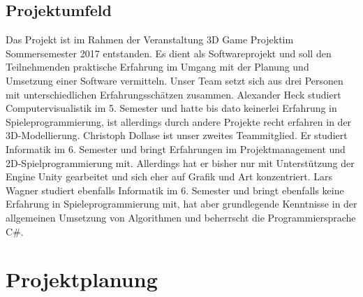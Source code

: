 \documentclass[10pt]{article}
\begin{document}
\newpage
\vspace{0.5cm}
\subsection{Projektumfeld}
Das Projekt ist im Rahmen der Veranstaltung \glqq 3D Game Projekt\grqq im Sommersemester 2017 entstanden. Es dient als Softwareprojekt und soll den Teilnehmenden praktische Erfahrung im Umgang mit der Planung und Umsetzung einer Software vermitteln. Unser Team setzt sich aus drei Personen mit unterschiedlichen Erfahrungsschätzen zusammen. \newline
Alexander Heck studiert Computervisualistik im 5. Semester und hatte bis dato keinerlei Erfahrung in Spieleprogrammierung, ist allerdings durch andere Projekte recht erfahren in der 3D-Modellierung. \newline
Christoph Dollase ist unser zweites Teammitglied. Er studiert Informatik im 6. Semester und bringt Erfahrungen im Projektmanagement und 2D-Spielprogrammierung mit. Allerdings hat er bisher nur mit Unterstützung der Engine Unity gearbeitet und sich eher auf Grafik und Art konzentriert. \newline
Lars Wagner studiert ebenfalls Informatik im 6. Semester und bringt ebenfalls keine Erfahrung in Spieleprogrammierung mit, hat aber grundlegende Kenntnisse in der allgemeinen Umsetzung von Algorithmen und beherrscht die Programmiersprache C\#.


\newpage
\section{Projektplanung}
\end{document}
